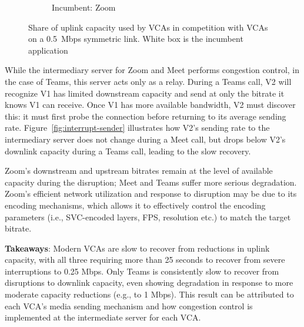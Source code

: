 \begin{figure}[t!]
\begin{subfigure}[t]{.33\textwidth}
        \caption{Incumbent: Zoom}
        \label{fig:zoom_ul_box}
    \end{subfigure}
    \caption{Share of uplink capacity used by VCAs in competition with VCAs on a 0.5~Mbps symmetric link. White box is the incumbent application}
    \label{fig:boxplot-upld}
\end{figure}

While the intermediary server for Zoom and Meet performs congestion control,
in the case of Teams, this server acts only as a relay. During a
Teams call, V2 will recognize V1 has limited downstream capacity and 
send at only the bitrate it knows V1 can receive.
Once V1 has more available bandwidth, V2 must discover this: it must first
probe the connection before returning to its average sending rate.
Figure~\ref{fig:interrupt-sender} illustrates how V2's sending rate to the intermediary server does not
change during a Meet call, but drops below V2's downlink capacity during a
Teams call, leading to the slow recovery.

Zoom's downstream and upstream bitrates remain at the level of available
capacity during the disruption; Meet and Teams suffer more
serious degradation. Zoom's efficient network utilization and response to
disruption may be due to its encoding mechanisms, which allows it to  
effectively control the encoding parameters (i.e., SVC-encoded layers, FPS,
resolution etc.) to match the target bitrate.  
\vspace{5pt}
\begin{mdframed}[roundcorner=5pt, backgroundcolor=black!10] \noindent
    \textbf{Takeaways}: Modern VCAs are slow to recover from reductions in uplink 
    capacity, with all three requiring more than 25 seconds to recover from severe
    interruptions to 0.25 Mbps. Only Teams is consistently slow to recover
    from disruptions to downlink capacity, even showing degradation in
    response to more moderate capacity reductions (e.g., to 1 Mbps).
    This result can be attributed to each VCA's media sending mechanism and how
    congestion control is implemented at the intermediate server for each VCA. 
\end{mdframed}


